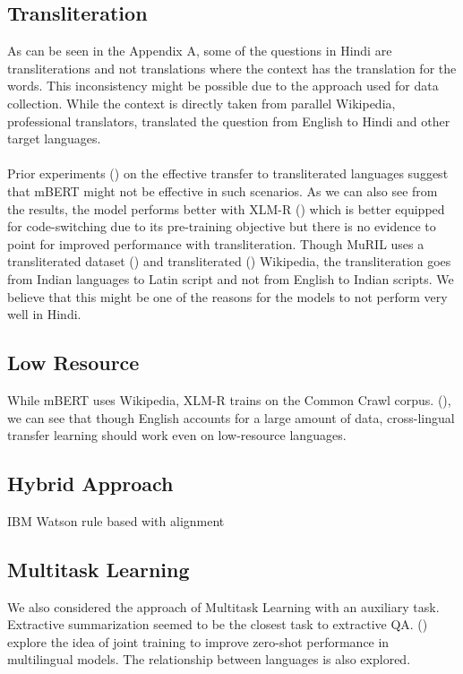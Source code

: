 \documentclass[12pt]{article}   %
\begin{document}
\subsection{Transliteration}
As can be seen in the Appendix A, some of the questions in Hindi are transliterations and not translations where the context has the translation for the words. This inconsistency might be possible due to the approach used for data collection. While the context is directly taken from parallel Wikipedia, professional translators, translated the question from English to Hindi and other target languages.
\\ \\
Prior experiments (\cite{pires-etal-2019-multilingual}) on the effective transfer to transliterated languages suggest that mBERT might not be effective in such scenarios. As we can also see from the results, the model performs better with XLM-R (\cite{conneau2019unsupervised}) which is better equipped for code-switching due to its pre-training objective but there is no evidence to point for improved performance with transliteration. Though MuRIL uses a transliterated dataset (\cite{roark-etal-2020-processing}) and transliterated (\cite{indictrans}) Wikipedia, the transliteration goes from Indian languages to Latin script and not from English to Indian scripts. We believe that this might be one of the reasons for the models to not perform very well in Hindi.	
\subsection{Low Resource}
While mBERT uses Wikipedia, XLM-R trains on the Common Crawl corpus. (\cite{wu-dredze-2020-languages}), we can see that though English accounts for a large amount of data, cross-lingual transfer learning should work even on low-resource languages.


\subsection{Hybrid Approach}
IBM Watson rule based with alignment

\subsection{Multitask Learning}
We also considered the approach of Multitask Learning with an auxiliary task. Extractive summarization seemed to be the closest task to extractive QA. (\cite{ahuja-etal-2022-multi}) explore the idea of joint training to improve zero-shot performance in multilingual models. The relationship between languages is also explored.
\end{document}
